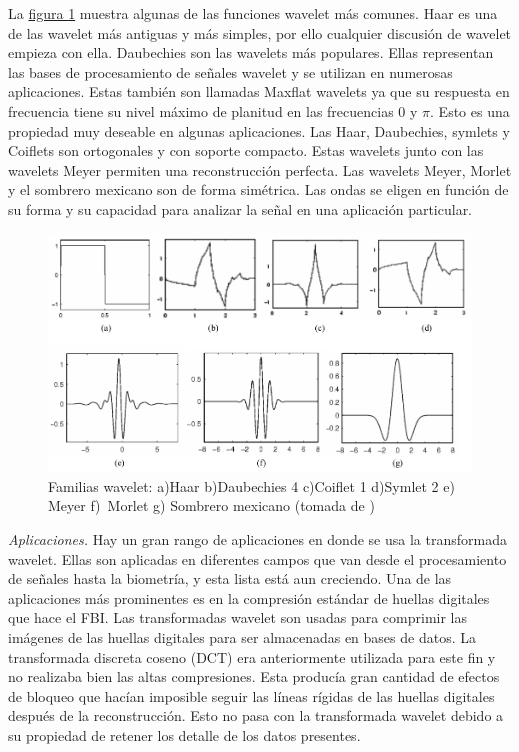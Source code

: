 \documentclass[11pt,lettersize]{article} %
\newcommand{\figura}[1]{\hyperref[{#1}]{figura \ref*{#1}}}
\begin{document}
La \figura{F-wavelet-ejem} muestra algunas de las funciones wavelet más comunes. Haar es una de las wavelet más antiguas y más simples, por ello cualquier discusión de wavelet empieza con ella. Daubechies\cite{Daubechies1992} son las wavelets más populares. Ellas representan las bases de procesamiento de señales wavelet y se utilizan en numerosas aplicaciones. Estas también son llamadas Maxflat wavelets ya que su respuesta en frecuencia tiene su nivel máximo de planitud en las frecuencias $0$ y $\pi$. Esto es una propiedad muy deseable en algunas aplicaciones. Las Haar, Daubechies, symlets y Coiflets son ortogonales y con soporte compacto. Estas wavelets junto con las wavelets Meyer permiten una reconstrucción perfecta. Las wavelets Meyer, Morlet y el sombrero mexicano son de forma simétrica. Las ondas se eligen en función de su forma y su capacidad para analizar la señal en una aplicación particular.
\begin{figure}[h!]
	\centering
	\includegraphics[width=.9\textwidth]{images/wavelet-ejem.png}
	\caption[Familias wavelet]{Familias wavelet: a)Haar b)Daubechies 4 c)Coiflet 1 d)Symlet 2 e) Meyer \mbox{f) Morlet} g) Sombrero mexicano  (tomada de \cite{Sripathi2003})}
	\label{F-wavelet-ejem}
\end{figure}

\textit{Aplicaciones.}
Hay un gran rango de aplicaciones en donde se usa la transformada wavelet. Ellas son aplicadas en diferentes campos que van desde el procesamiento de señales hasta la biometría, y esta lista está aun creciendo. Una de las aplicaciones más prominentes es en la compresión estándar de huellas digitales que hace el FBI. Las transformadas wavelet son usadas para comprimir las imágenes de las huellas digitales para ser almacenadas en bases de datos. La transformada discreta coseno (DCT) era anteriormente utilizada para este fin y no realizaba bien las altas compresiones. Esta producía gran cantidad de efectos de bloqueo que hacían imposible seguir las líneas rígidas de las huellas digitales después de la reconstrucción. Esto no pasa con la transformada wavelet debido a su propiedad de retener los detalle de los datos presentes.\\
\end{document}
